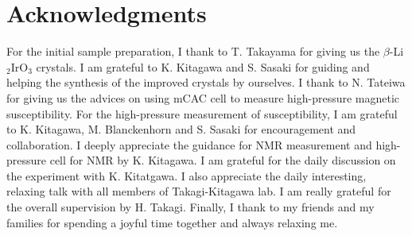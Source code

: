 \chapter*{Acknowledgments}
For the initial sample preparation, I thank to T. Takayama for giving us the $\beta$-Li$_2$IrO$_3$ crystals.
I am grateful to K. Kitagawa and S. Sasaki for guiding and helping the synthesis of the improved crystals by ourselves.
I thank to N. Tateiwa for giving us the advices on using mCAC cell to measure high-pressure magnetic susceptibility.
For the high-pressure measurement of susceptibility, I am grateful to K. Kitagawa, M. Blanckenhorn and S. Sasaki for encouragement and collaboration.
I deeply appreciate the guidance for NMR measurement and high-pressure cell for NMR by K. Kitagawa.
I am grateful for the daily discussion on the experiment with K. Kitatgawa.
I also appreciate the daily interesting, relaxing talk with all members of Takagi-Kitagawa lab.
I am really grateful for the overall supervision by H. Takagi.
Finally, I thank to my friends and my families for spending a joyful time together and always relaxing me.
